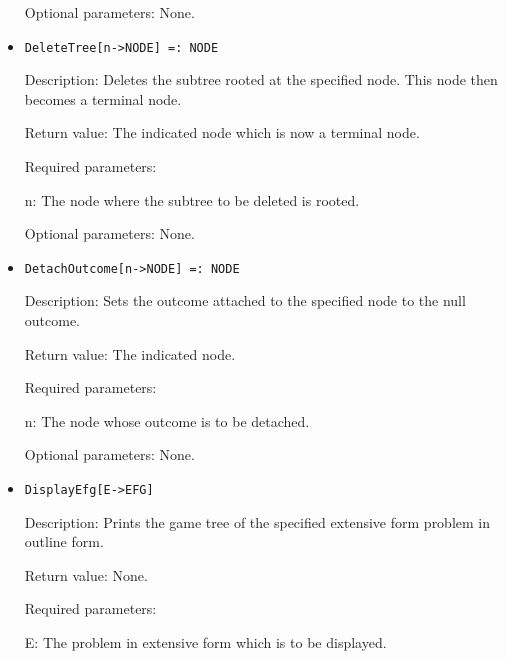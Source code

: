 \begin{itemize}
\item
[Optional parameters:] None.
\ed

\item
\protect \large \begin{verbatim}
DeleteTree[n->NODE] =: NODE
\end{verbatim}\normalsize

\bd
\item
[Description:] Deletes the subtree rooted at the specified node.
This node then becomes a terminal node.
\item
[Return value:] The indicated node which is now a terminal node.
\item
[Required parameters:]\hfil\null

\bd
\item  
[ n:] The node where the subtree to be deleted is rooted.
\ed

\item
[Optional parameters:] None.
\ed

\item
\protect \large \begin{verbatim}
DetachOutcome[n->NODE] =: NODE
\end{verbatim}\normalsize

\bd
\item
[Description:] Sets the outcome attached to the specified node to the 
null outcome.
\item   
[Return value:] The indicated node.
\item
[Required parameters:]\hfil\null

\bd
\item	
[ n:] The node whose outcome is to be detached.
\ed

\item
[Optional parameters:] None.
\ed

\item
\protect \large \begin{verbatim}
DisplayEfg[E->EFG]
\end{verbatim}\normalsize

\bd
\item
[Description:] Prints the game tree of the specified extensive form
problem in outline form.
\item
[Return value:] None.
\item
[Required parameters:]\hfil\null

\bd
\item
[E:] The problem in extensive form which is to be displayed.
\ed


\end{itemize}
